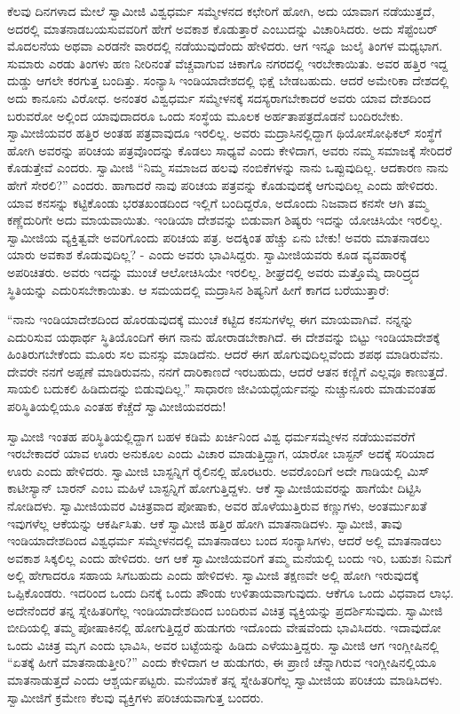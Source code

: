  ಕೆಲವು ದಿನಗಳಾದ ಮೇಲೆ ಸ್ವಾಮೀಜಿ ವಿಶ್ವಧರ್ಮ ಸಮ್ಮೇಳನದ ಕಛೇರಿಗೆ ಹೋಗಿ, ಅದು ಯಾವಾಗ ನಡೆಯುತ್ತದೆ, ಅದರಲ್ಲಿ ಮಾತನಾಡಬಯಸುವವರಿಗೆ ಹೇಗೆ ಅವಕಾಶ ಕೊಡುತ್ತಾರೆ ಎಂಬುದನ್ನು ವಿಚಾರಿಸಿದರು. ಅದು ಸೆಪ್ಟೆಂಬರ್ ಮೊದಲನೆಯ ಅಥವಾ ಎರಡನೇ ವಾರದಲ್ಲಿ ನಡೆಯುವುದೆಂದು ಹೇಳಿದರು. ಆಗ ಇನ್ನೂ ಜುಲೈ ತಿಂಗಳ ಮಧ್ಯಭಾಗ. ಸುಮಾರು ಎರಡು ತಿಂಗಳು ಹಣ ನೀರಿನಂತೆ ವೆಚ್ಚವಾಗುವ ಚಿಕಾಗೊ ನಗರದಲ್ಲಿ ಇರಬೇಕಾಯಿತು. ಅವರ ಹತ್ತಿರ ಇದ್ದ ದುಡ್ಡು ಆಗಲೇ ಕರಗುತ್ತ ಬಂದಿತ್ತು. ಸಂನ್ಯಾಸಿ ಇಂಡಿಯಾದೇಶದಲ್ಲಿ ಭಿಕ್ಷೆ ಬೇಡಬಹುದು. ಆದರೆ ಅಮೇರಿಕಾ ದೇಶದಲ್ಲಿ ಅದು ಕಾನೂನು ವಿರೋಧ. ಅನಂತರ ವಿಶ್ವಧರ್ಮ ಸಮ್ಮೇಳನಕ್ಕೆ ಸದಸ್ಯರಾಗಬೇಕಾದರೆ ಅವರು ಯಾವ ದೇಶದಿಂದ ಬರುವರೋ ಅಲ್ಲಿಂದ ಯಾವುದಾದರೂ ಒಂದು ಸಂಸ್ಥೆಯ ಮೂಲಕ ಅರ್ಹತಾಪತ್ರದೊಡನೆ ಬಂದಿರಬೇಕು. ಸ್ವಾಮೀಜಿಯವರ ಹತ್ತಿರ ಅಂತಹ ಪತ್ರವಾವುದೂ ಇರಲಿಲ್ಲ. ಅವರು ಮದ್ರಾಸಿನಲ್ಲಿದ್ದಾಗ ಥಿಯೋಸೋಫಿಕಲ್ ಸಂಸ್ಥೆಗೆ ಹೋಗಿ ಅವರನ್ನು ಪರಿಚಯ ಪತ್ರವೊಂದನ್ನು ಕೊಡಲು ಸಾಧ್ಯವೆ ಎಂದು ಕೇಳಿದಾಗ, ಅವರು ನಮ್ಮ ಸಮಾಜಕ್ಕೆ ಸೇರಿದರೆ ಕೊಡುತ್ತೇವೆ ಎಂದರು. ಸ್ವಾಮೀಜಿ “ನಿಮ್ಮ ಸಮಾಜದ ಹಲವು ನಂಬಿಕೆಗಳನ್ನು ನಾನು ಒಪ್ಪುವುದಿಲ್ಲ. ಆದಕಾರಣ ನಾನು ಹೇಗೆ ಸೇರಲಿ?” ಎಂದರು. ಹಾಗಾದರೆ ನಾವು ಪರಿಚಯ ಪತ್ರವನ್ನು ಕೊಡುವುದಕ್ಕೆ ಆಗುವುದಿಲ್ಲ ಎಂದು ಹೇಳಿದರು. ಯಾವ ಕನಸನ್ನು ಕಟ್ಟಿಕೊಂಡು ಭರತಖಂಡದಿಂದ ಇಲ್ಲಿಗೆ ಬಂದಿದ್ದರೊ, ಅದೊಂದು ನಿಜವಾದ ಕನಸೇ ಆಗಿ ತಮ್ಮ ಕಣ್ಣೆದುರಿಗೇ ಅದು ಮಾಯವಾಯಿತು. ಇಂಡಿಯಾ ದೇಶವನ್ನು ಬಿಡುವಾಗ ಶಿಷ್ಯರು ಇದನ್ನು ಯೋಚಿಸಿಯೇ ಇರಲಿಲ್ಲ. ಸ್ವಾಮೀಜಿಯ ವ್ಯಕ್ತಿತ್ವವೇ ಅವರಿಗೊಂದು ಪರಿಚಯ ಪತ್ರ. ಅದಕ್ಕಿಂತ ಹೆಚ್ಚು ಏನು ಬೇಕು! ಅವರು ಮಾತನಾಡಲು ಯಾರು ಅವಕಾಶ ಕೊಡುವುದಿಲ್ಲ? - ಎಂದು ಅವರು ಭಾವಿಸಿದ್ದರು. ಸ್ವಾಮೀಜಿಯವರು ಕೂಡ ವ್ಯವಹಾರಕ್ಕೆ ಅಪರಿಚಿತರು. ಅವರು ಇದನ್ನು ಮುಂಚೆ ಆಲೋಚಿಸಿಯೇ ಇರಲಿಲ್ಲ. ಶೀಘ್ರದಲ್ಲಿ ಅವರು ಮತ್ತೊಮ್ಮೆ ದಾರಿದ್ರ್ಯದ ಸ್ಥಿತಿಯನ್ನು ಎದುರಿಸಬೇಕಾಯಿತು. ಆ ಸಮಯದಲ್ಲಿ ಮದ್ರಾಸಿನ ಶಿಷ್ಯನಿಗೆ ಹೀಗೆ ಕಾಗದ ಬರೆಯುತ್ತಾರೆ: 

 “ನಾನು ಇಂಡಿಯಾದೇಶದಿಂದ ಹೊರಡುವುದಕ್ಕೆ ಮುಂಚೆ ಕಟ್ಟಿದ ಕನಸುಗಳೆಲ್ಲ ಈಗ ಮಾಯವಾಗಿವೆ. ನನ್ನನ್ನು ಎದುರಿಸುವ ಯಥಾರ್ಥ ಸ್ಥಿತಿಯೊಂದಿಗೆ ಈಗ ನಾನು ಹೋರಾಡಬೇಕಾಗಿದೆ. ಈ ದೇಶವನ್ನು ಬಿಟ್ಟು ಇಂಡಿಯಾದೇಶಕ್ಕೆ ಹಿಂತಿರುಗಬೇಕೆಂದು ಮೂರು ಸಲ ಮನಸ್ಸು ಮಾಡಿದೆನು. ಆದರೆ ಈಗ ಹೊಗುವುದಿಲ್ಲವೆಂದು ಶಪಥ ಮಾಡಿರುವೆನು. ದೇವರೇ ನನಗೆ ಅಪ್ಪಣೆ ಮಾಡಿರುವನು, ನನಗೆ ದಾರಿಕಾಣದೆ ಇರಬಹುದು, ಆದರೆ ಆತನ ಕಣ್ಣಿಗೆ ಎಲ್ಲವೂ ಕಾಣುತ್ತದೆ. ಸಾಯಲಿ ಬದುಕಲಿ ಹಿಡಿದುದನ್ನು ಬಿಡುವುದಿಲ್ಲ.” ಸಾಧಾರಣ ಜೀವಿಯಧೈರ್ಯವನ್ನು ನುಚ್ಚುನೂರು ಮಾಡುವಂತಹ ಪರಿಸ್ಥಿತಿಯಲ್ಲಿಯೂ ಎಂತಹ ಕೆಚ್ಚೆದೆ ಸ್ವಾಮೀಜಿಯವರದು! 

 ಸ್ವಾಮೀಜಿ ಇಂತಹ ಪರಿಸ್ಥಿತಿಯಲ್ಲಿದ್ದಾಗ ಬಹಳ ಕಡಿಮೆ ಖರ್ಚಿನಿಂದ ವಿಶ್ವ ಧರ್ಮಸಮ್ಮೇಳನ ನಡೆಯುವವರೆಗೆ ಇರಬೇಕಾದರೆ ಯಾವ ಊರು ಅನುಕೂಲ ಎಂದು ವಿಚಾರ ಮಾಡುತ್ತಿದ್ದಾಗ, ಯಾರೋ ಬಾಸ್ಟನ್ ಅದಕ್ಕೆ ಸರಿಯಾದ ಊರು ಎಂದು ಹೇಳಿದರು. ಸ್ವಾಮೀಜಿ ಬಾಸ್ಟನ್ನಿಗೆ ರೈಲಿನಲ್ಲಿ ಹೊರಟರು. ಅವರೊಂದಿಗೆ ಅದೇ ಗಾಡಿಯಲ್ಲಿ ಮಿಸ್ ಕಾಟೀಸ್ಯಾನ್ ಬಾರನ್ ಎಂಬ ಮಹಿಳೆ ಬಾಸ್ಟನ್ನಿಗೆ ಹೋಗುತ್ತಿದ್ದಳು. ಆಕೆ ಸ್ವಾಮೀಜಿಯವರನ್ನು ಹಾಗೆಯೇ ದಿಟ್ಟಿಸಿ ನೋಡಿದಳು. ಸ್ವಾಮೀಜಿಯವರ ವಿಚಿತ್ರವಾದ ಪೋಷಾಕು, ಅವರ ಹೊಳೆಯುತ್ತಿರುವ ಕಣ್ಣುಗಳು, ಅಂತರ್ಮುಖತೆ ಇವುಗಳೆಲ್ಲ ಆಕೆಯನ್ನು ಆಕರ್ಷಿಸಿತು. ಆಕೆ ಸ್ವಾಮೀಜಿ ಹತ್ತಿರ ಹೋಗಿ ಮಾತನಾಡಿದಳು. ಸ್ವಾಮೀಜಿ, ತಾವು ಇಂಡಿಯಾದೇಶದಿಂದ ವಿಶ್ವಧರ್ಮ ಸಮ್ಮೇಳನದಲ್ಲಿ ಮಾತನಾಡಲು ಬಂದ ಸಂನ್ಯಾಸಿಗಳು, ಆದರೆ ಅಲ್ಲಿ ಮಾತನಾಡಲು ಅವಕಾಶ ಸಿಕ್ಕಲಿಲ್ಲ ಎಂದು ಹೇಳಿದರು. ಆಗ ಆಕೆ ಸ್ವಾಮೀಜಿಯವರಿಗೆ ತಮ್ಮ ಮನೆಯಲ್ಲಿ ಬಂದು ಇರಿ, ಬಹುಶಃ ನಿಮಗೆ ಅಲ್ಲಿ ಹೇಗಾದರೂ ಸಹಾಯ ಸಿಗಬಹುದು ಎಂದು ಹೇಳಿದಳು. ಸ್ವಾಮೀಜಿ ತಕ್ಷಣವೇ ಅಲ್ಲಿ ಹೋಗಿ ಇರುವುದಕ್ಕೆ ಒಪ್ಪಿಕೊಂಡರು. ಇದರಿಂದ ಒಂದು ದಿನಕ್ಕೆ ಒಂದು ಪೌಂಡು ಉಳಿತಾಯವಾಗುವುದು. ಆಕೆಗೂ ಒಂದು ವಿಧವಾದ ಲಾಭ. ಅದೇನೆಂದರೆ ತನ್ನ ಸ್ನೇಹಿತರಿಗೆಲ್ಲ ಇಂಡಿಯಾದೇಶದಿಂದ ಬಂದಿರುವ ವಿಚಿತ್ರ ವ್ಯಕ್ತಿಯನ್ನು ಪ್ರದರ್ಶಿಸುವುದು. ಸ್ವಾಮೀಜಿ ಬೀದಿಯಲ್ಲಿ ತಮ್ಮ ಪೋಷಾಕಿನಲ್ಲಿ ಹೋಗುತ್ತಿದ್ದರೆ ಹುಡುಗರು ಇದೊಂದು ವೇಷವೆಂದು ಭಾವಿಸಿದರು. ಇದಾವುದೋ ಒಂದು ವಿಚಿತ್ರ ಮೃಗ ಎಂದು ಭಾವಿಸಿ, ಅವರ ಬಟ್ಟೆಯನ್ನು ಹಿಡಿದು ಎಳೆಯುತ್ತಿದ್ದರು. ಸ್ವಾಮೀಜಿ ಆಗ ಇಂಗ್ಲೀಷಿನಲ್ಲಿ “ಏತಕ್ಕೆ ಹೀಗೆ ಮಾತನಾಡುತ್ತೀರಿ?” ಎಂದು ಕೇಳಿದಾಗ ಆ ಹುಡುಗರು, ಈ ಪ್ರಾಣಿ ಚೆನ್ನಾಗಿರುವ ಇಂಗ್ಲೀಷಿನಲ್ಲಿಯೂ ಮಾತನಾಡುತ್ತದೆ ಎಂದು ಆಶ್ಚರ್ಯಪಟ್ಟರು. ಮನೆಯಾಕೆ ತನ್ನ ಸ್ನೇಹಿತರಿಗೆಲ್ಲ ಸ್ವಾಮೀಜಿಯ ಪರಿಚಯ ಮಾಡಿಸಿದಳು. ಸ್ವಾಮೀಜಿಗೆ ಕ್ರಮೇಣ ಕೆಲವು ವ್ಯಕ್ತಿಗಳು ಪರಿಚಯವಾಗುತ್ತ ಬಂದರು. 


